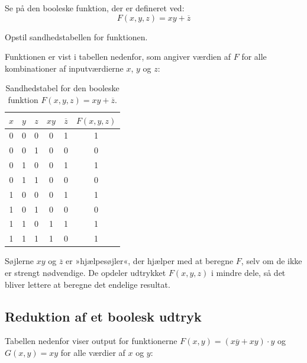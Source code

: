 \begin{example}Se på den booleske funktion, der er defineret ved:
    \[
F(x, y, z) = xy + \overline{z}
\]

Opstil sandhedstabellen for funktionen.

\begin{solution} Funktionen er vist i tabellen nedenfor, som angiver værdien af \( F \) for alle kombinationer af inputværdierne \( x \), \( y \) og \( z \):

\begin{table}[h!]
\begin{center}
\renewcommand{\arraystretch}{1.5} %
\begin{tabular}{c|c|c|c|c|c}

$x$ & $y$ & $z$ & $xy$ & $\overline{z}$ & $F(x, y, z)$ \\
\hline
0 & 0 & 0 & 0 & 1 & 1 \\
\rowcolor{gray!20}
0 & 0 & 1 & 0 & 0 & 0 \\
0 & 1 & 0 & 0 & 1 & 1 \\
\rowcolor{gray!20}
0 & 1 & 1 & 0 & 0 & 0 \\
1 & 0 & 0 & 0 & 1 & 1 \\
\rowcolor{gray!20}
1 & 0 & 1 & 0 & 0 & 0 \\
1 & 1 & 0 & 1 & 1 & 1 \\
\rowcolor{gray!20}
1 & 1 & 1 & 1 & 0 & 1 \\
\end{tabular}
\end{center}
\caption{Sandhedstabel for den booleske funktion \( F(x, y, z) = xy + \overline{z} \).}
\label{tab:boolean_example}
\end{table}

Søjlerne \( xy \) og \( \overline{z} \) er »hjælpesøjler«, der hjælper med at beregne \( F \), selv om de ikke er strengt nødvendige. De opdeler udtrykket \( F(x, y, z) \) i mindre dele, så det bliver lettere at beregne det endelige resultat.
    
\end{solution}
\end{example}

\subsection*{Reduktion af et boolesk udtryk}

Tabellen nedenfor viser output for funktionerne \( F(x, y) = (x\overline{y} + xy) \cdot y \) og \( G(x, y) = xy \) for alle værdier af \( x \) og \( y \):

